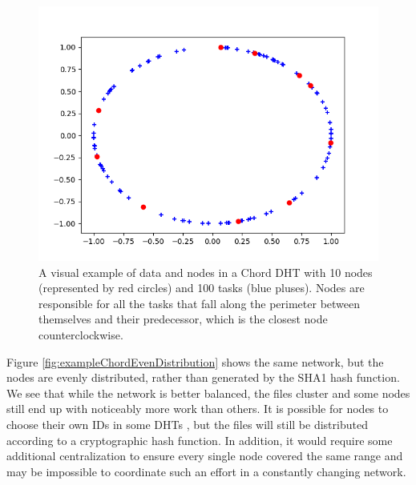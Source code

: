 \documentclass[10pt,conference]{IEEEtran}
\begin{document}
\begin{figure}
	\centering
	\includegraphics[width=0.9\linewidth]{figs/exampleChordUnevenRedone}
	\caption[Distribution of Nodes and Tasks in a Chord DHT]{A visual example of data and nodes in a Chord DHT with 10 nodes (represented by red circles) and 100 tasks (blue pluses). Nodes are responsible for all the tasks that fall along the perimeter between themselves and their predecessor, which is the closest node counterclockwise.}
	\label{fig:exampleChordDistribution}
\end{figure}

Figure \ref{fig:exampleChordEvenDistribution} shows the same network, but the nodes are evenly distributed, rather than generated by the SHA1 hash function.
We see that while the network is better balanced, the files cluster and some nodes still end up with noticeably more work than others.
It is possible for nodes to choose their own IDs in some DHTs \cite{mainline}, but the files will still be distributed according to a cryptographic hash function.
In addition, it would require some additional centralization to ensure every single node covered the same range and may be impossible to coordinate such an effort in a constantly changing network.
\end{document}

